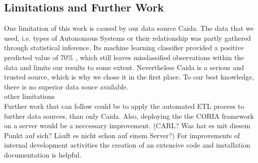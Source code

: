 \documentclass[conference, 11pt]{IEEEtran}
\begin{document}
\subsection{Limitations and Further Work}

 
One limitation of this work is caused by our data source Caida. The data that we used, i.e. types of Autonomous Systems or their relationship was partly gathered through statistical inference. Its machine learning classifier provided a positive predicted value of 70\% \cite{Classification}, which still leaves misslassified observations within the data and limits our results to some extent. Nevertheless Caida is a serious and trusted source, which is why we chose it in the first place. To our best knowledge, there is no superior data souce available.  \\ 

other limitations\\



Further work that can follow could be to apply the automated ETL process to further data sources, than only Caida. Also, deploying the the CORIA framework on a server would be a neccessary improvement. (CARL? Was hat es mit diesem Punkt auf sich? Läuft es nicht schon auf einem Server?) For improvements of internal development activities the creation of an extensive code and installation documentation is helpful.
\end{document}
